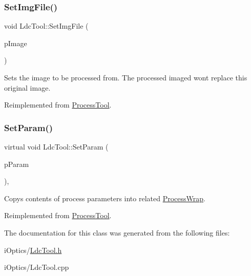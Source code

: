 \mbox{\label{class_ldc_tool_a07d1a547f02d4dea6a480c1be875a685}} 
\subsubsection{\texorpdfstring{Set\+Img\+File()}{SetImgFile()}}
{\footnotesize\ttfamily void Ldc\+Tool\+::\+Set\+Img\+File (\begin{DoxyParamCaption}\item[{Img\+File $\ast$}]{p\+Image }\end{DoxyParamCaption})\hspace{0.3cm}{\ttfamily [virtual]}}

Sets the image to be processed from. The processed imaged won\textquotesingle{}t replace this original image. 

Reimplemented from \mbox{\hyperlink{class_process_tool_a178bc06abf5a20220bd2306a14708a93}{Process\+Tool}}.

\mbox{\label{class_ldc_tool_a1c98303e0ab2dfea1f1dcca8f1548307}} 
\subsubsection{\texorpdfstring{Set\+Param()}{SetParam()}}
{\footnotesize\ttfamily virtual void Ldc\+Tool\+::\+Set\+Param (\begin{DoxyParamCaption}\item[{\mbox{\hyperlink{class_process_wrap}{Process\+Wrap}} $\ast$}]{p\+Param }\end{DoxyParamCaption})\hspace{0.3cm}{\ttfamily [inline]}, {\ttfamily [virtual]}}

Copys contents of process parameters into related \mbox{\hyperlink{class_process_wrap}{Process\+Wrap}}. 

Reimplemented from \mbox{\hyperlink{class_process_tool_a50caa175198cece00b39a146715bf3eb}{Process\+Tool}}.



The documentation for this class was generated from the following files\+:\begin{DoxyCompactItemize}
\item 
i\+Optics/\mbox{\hyperlink{_ldc_tool_8h}{Ldc\+Tool.\+h}}\item 
i\+Optics/Ldc\+Tool.\+cpp\end{DoxyCompactItemize}
